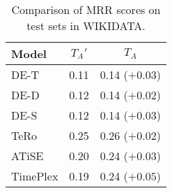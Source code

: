 \begin{table*}[htb]
\centering
\begin{minipage}{\fullwidthcaption}
\centering
\caption{Comparison of MRR scores on test sets in WIKIDATA.}
\vspace{-3mm}

\begin{tabular}{l|cc}\hline
Model & $T_A'$ & $T_A$ \\ \hline
DE-T & 0.11 & 0.14 ($+0.03$) \\ 
DE-D & 0.12 & 0.14 ($+0.02$) \\ 
DE-S & 0.12 & 0.14 ($+0.03$) \\ 
TeRo & 0.25 & 0.26 ($+0.02$) \\ 
ATiSE & 0.20 & 0.24 ($+0.03$) \\ 
TimePlex & 0.19 & 0.24 ($+0.05$) \\ 
 \hline
\end{tabular}

\label{tab:relation_properties_wikidata12k_comparison}
\end{minipage}
\end{table*}

